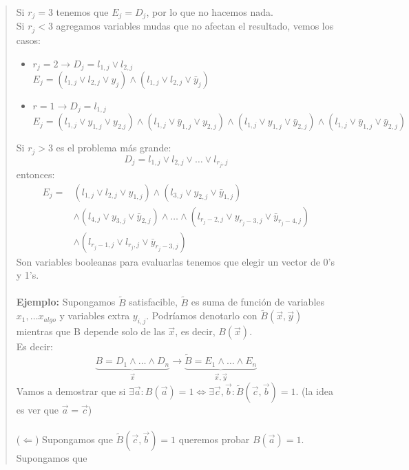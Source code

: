 \documentclass[11pt, a4paper]{article}
\theoremstyle{definition}
\begin{document}
\begin{quote}
    Si $r_j = 3$ tenemos que $E_j = D_j$, por lo que no hacemos nada.\\
    Si $r_j < 3$ agregamos variables mudas que no afectan el resultado, vemos los casos:
        \begin{itemize}
            \item $r_j = 2 \rightarrow D_j = l_{1,j} \vee l_{2,j}$\\
                  $E_j = (l_{1,j} \vee l_{2,j} \vee y_j) \wedge (l_{1,j} \vee l_{2,j} \vee \bar{y}_j)$
            \item $r = 1 \rightarrow D_j = l_{1,j}$\\
                  $E_j = (l_{1,j} \vee y_{1,j} \vee y_{2.j}) \wedge (l_{1,j} \vee \bar{y}_{1,j} \vee y_{2,j}) \wedge (l_{1,j} \vee y_{1,j} \vee \bar{y}_{2,j}) \wedge (l_{1,j} \vee \bar{y}_{1,j} \vee \bar{y}_{2,j})$
            \end{itemize}
    Si $r_j > 3$ es el problema más grande:
    \[
        D_j = l_{1,j} \vee l_{2,j} \vee \ldots \vee l_{r_j,j}
    \]
    entonces:
    \begin{align*}
        E_j = &(l_{1,j} \vee l_{2,j} \vee y_{1,j}) \wedge (l_{3,j} \vee y_{2,j} \vee \bar{y}_{1,j}) \\
              &\wedge (l_{4,j} \vee y_{3,j} \vee \bar{y}_{2,j}) \wedge \ldots \wedge (l_{r_j-2,j} \vee y_{r_j-3,j} \vee \bar{y}_{r_j-4,j}) \\
              &\wedge (l_{r_j-1,j} \vee l_{r_j,j} \vee \bar{y}_{r_j-3,j})
    \end{align*}
    Son variables booleanas para evaluarlas tenemos que elegir un vector de 0's y 1's.\\ \\
    \textbf{Ejemplo:} Supongamos $\tilde{B}$ satisfacible, $\tilde{B}$ es suma de función de variables $x_1,\ldots x_{algo}$ y
    variables extra $y_{i,j}$. Podríamos denotarlo con $\tilde{B}(\vec{x}, \vec{y})$ mientras que B depende solo de
    las $\vec{x}$, es decir, $B(\vec{x})$.\\
    Es decir:
    \[
        \underbrace{B = D_1 \wedge \ldots \wedge D_n}_{\vec{x}}
        \rightarrow 
        \underbrace{\tilde{B} = E_1 \wedge \ldots \wedge E_n}_{\vec{x},\vec{y}}
    \]
    Vamos a demostrar que si $\exists \vec{a} : B(\vec{a}) = 1 \Leftrightarrow \exists \vec{c}, \vec{b} : \tilde{B}(\vec{c}, \vec{b}) = 1$. (la idea es ver
    que $\vec{a} = \vec{c}$)\\ \\
    ($\Leftarrow$) Supongamos que $\tilde{B}(\vec{c}, \vec{b}) = 1$ queremos probar $B(\vec{a}) = 1$. Supongamos que

\end{quote}
\end{document}
